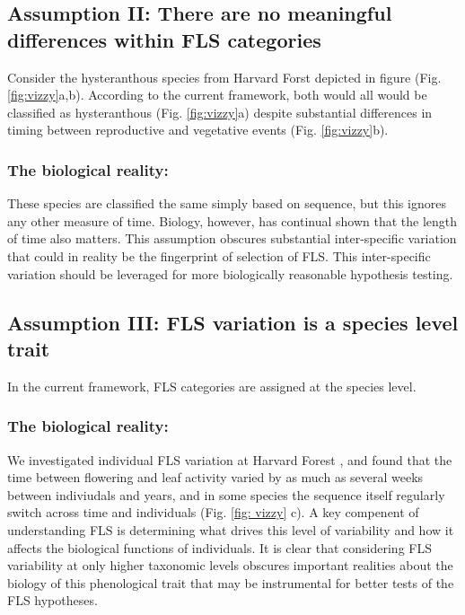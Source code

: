 \documentclass{article}
\begin{document}
{\subsection*{Assumption II: There are no meaningful differences within FLS categories}
 Consider the hysteranthous species from Harvard Forst depicted in figure (Fig. \ref{fig:vizzy}a,b). According to the current framework, both would all would be classified as hysteranthous (Fig. \ref{fig:vizzy}a) despite substantial differences in timing between reproductive and vegetative events (Fig. \ref{fig:vizzy}b).
\subsubsection*{The biological reality:}
These species are classified the same simply based on sequence, but this ignores any other measure of time. Biology, however, has continual shown that the length of time also matters\citep{Inouye2019}. This assumption obscures substantial inter-specific variation that could in reality be the fingerprint of selection of FLS. This inter-specific variation should be leveraged for more biologically reasonable hypothesis testing.

\subsection*{Assumption III: FLS variation is a species level trait}
In the current framework, FLS categories are assigned at the species level.
\subsubsection*{The biological reality:}
We investigated individual FLS variation at Harvard Forest \citep{OKeefe2015}, and found that the time between flowering and leaf activity varied by as much as several weeks between indiviudals and years, and in some species the sequence itself regularly switch across time and individuals  (Fig. \ref{fig: vizzy} c). A key compenent of understanding FLS is determining what drives this level of variability and how it affects the biological functions of individuals. It is clear that considering FLS variability at only higher taxonomic levels obscures important realities about the biology of this phenological trait that may be instrumental for better tests of the FLS hypotheses.\\

}
\end{document}
